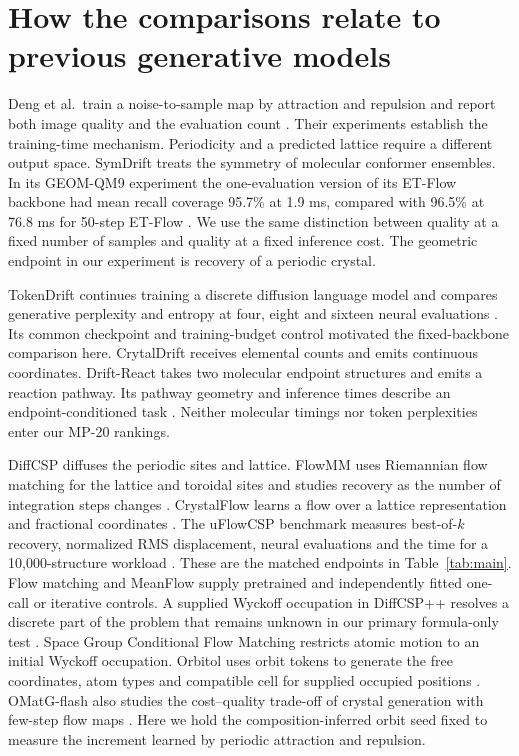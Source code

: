 \section{How the comparisons relate to previous generative models}
Deng et al.\ train a noise-to-sample map by attraction and repulsion and report both image quality and the evaluation count \cite{deng}. Their experiments establish the training-time mechanism. Periodicity and a predicted lattice require a different output space. SymDrift treats the symmetry of molecular conformer ensembles. In its GEOM-QM9 experiment the one-evaluation version of its ET-Flow backbone had mean recall coverage 95.7\% at 1.9 ms, compared with 96.5\% at 76.8 ms for 50-step ET-Flow \cite{symdrift}. We use the same distinction between quality at a fixed number of samples and quality at a fixed inference cost. The geometric endpoint in our experiment is recovery of a periodic crystal.

TokenDrift continues training a discrete diffusion language model and compares generative perplexity and entropy at four, eight and sixteen neural evaluations \cite{tokendrift}. Its common checkpoint and training-budget control motivated the fixed-backbone comparison here. CrytalDrift receives elemental counts and emits continuous coordinates. Drift-React takes two molecular endpoint structures and emits a reaction pathway. Its pathway geometry and inference times describe an endpoint-conditioned task \cite{driftreact}. Neither molecular timings nor token perplexities enter our MP-20 rankings.

DiffCSP diffuses the periodic sites and lattice. FlowMM uses Riemannian flow matching for the lattice and toroidal sites and studies recovery as the number of integration steps changes \cite{diffcsp,flowmm}. CrystalFlow learns a flow over a lattice representation and fractional coordinates \cite{crystalflow}. The uFlowCSP benchmark measures best-of-$k$ recovery, normalized RMS displacement, neural evaluations and the time for a 10,000-structure workload \cite{uflow}. These are the matched endpoints in Table~\ref{tab:main}. Flow matching and MeanFlow supply pretrained and independently fitted one-call or iterative controls. A supplied Wyckoff occupation in DiffCSP++ resolves a discrete part of the problem that remains unknown in our primary formula-only test \cite{diffcspplus}. Space Group Conditional Flow Matching restricts atomic motion to an initial Wyckoff occupation. Orbitol uses orbit tokens to generate the free coordinates, atom types and compatible cell for supplied occupied positions \cite{sgfm,orbitol}. OMatG-flash also studies the cost--quality trade-off of crystal generation with few-step flow maps \cite{omatg}. Here we hold the composition-inferred orbit seed fixed to measure the increment learned by periodic attraction and repulsion.

